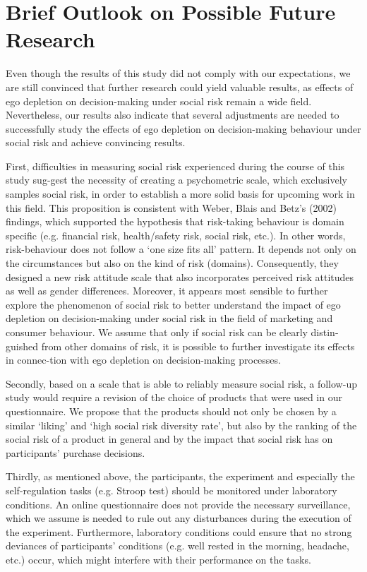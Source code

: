 \section{Brief Outlook on Possible Future Research}
Even though the results of this study did not comply with our expectations, we are still convinced that further research could yield valuable results, as effects of ego depletion on decision-making under social risk remain a wide field. Nevertheless, our results also indicate that several adjustments are needed to successfully study the effects of ego depletion on decision-making behaviour under social risk and achieve convincing results.\par
First, difficulties in measuring social risk experienced during the course of this study sug-gest the necessity of creating a psychometric scale, which exclusively samples social risk, in order to establish a more solid basis for upcoming work in this field. This proposition is consistent with Weber, Blais and Betz’s (2002) findings, which supported the hypothesis that risk-taking behaviour is domain specific (e.g. financial risk, health/safety risk, social risk, etc.). In other words, risk-behaviour does not follow a ‘one size fits all’ pattern. It depends not only on the circumstances but also on the kind of risk (domains). Consequently, they designed a new risk attitude scale that also incorporates perceived risk attitudes as well as gender differences. Moreover, it appears most sensible to further explore the phenomenon of social risk to better understand the impact of ego depletion on decision-making under social risk in the field of marketing and consumer behaviour. We assume that only if social risk can be clearly distin-guished from other domains of risk, it is possible to further investigate its effects in connec-tion with ego depletion on decision-making processes.\par
Secondly, based on a scale that is able to reliably measure social risk, a follow-up study would require a revision of the choice of products that were used in our questionnaire. We propose that the products should not only be chosen by a similar ‘liking’ and ‘high social risk diversity rate’, but also by the ranking of the social risk of a product in general and by the impact that social risk has on participants’ purchase decisions.\par
Thirdly, as mentioned above, the participants, the experiment and especially the self-regulation tasks (e.g. Stroop test) should be monitored under laboratory conditions. An online questionnaire does not provide the necessary surveillance, which we assume is needed to rule out any disturbances during the execution of the experiment. Furthermore, laboratory conditions could ensure that no strong deviances of participants’ conditions (e.g. well rested in the morning, headache, etc.) occur, which might interfere with their performance on the tasks. \par
